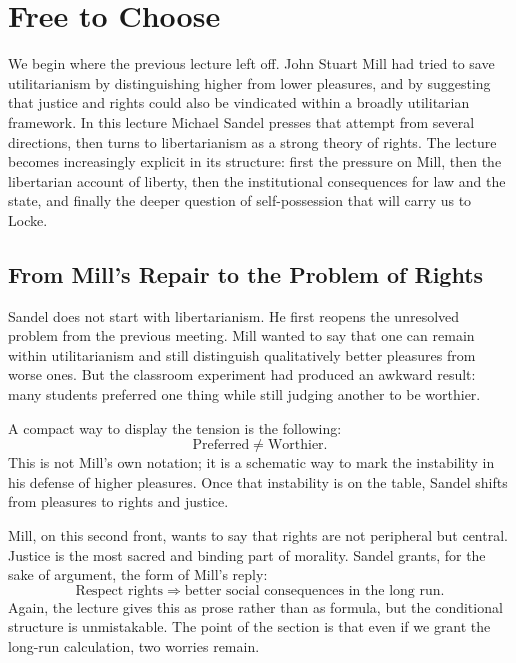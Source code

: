 \chapter{Free to Choose}

We begin where the previous lecture left off. John Stuart Mill had tried to save utilitarianism by distinguishing higher from lower pleasures, and by suggesting that justice and rights could also be vindicated within a broadly utilitarian framework. In this lecture Michael Sandel presses that attempt from several directions, then turns to libertarianism as a strong theory of rights. The lecture becomes increasingly explicit in its structure: first the pressure on Mill, then the libertarian account of liberty, then the institutional consequences for law and the state, and finally the deeper question of self-possession that will carry us to Locke.

\section{From Mill's Repair to the Problem of Rights}

Sandel does not start with libertarianism. He first reopens the unresolved problem from the previous meeting. Mill wanted to say that one can remain within utilitarianism and still distinguish qualitatively better pleasures from worse ones. But the classroom experiment had produced an awkward result: many students preferred one thing while still judging another to be worthier.

A compact way to display the tension is the following:
\begin{equation}
\text{Preferred} \neq \text{Worthier}.
\end{equation}
This is not Mill's own notation; it is a schematic way to mark the instability in his defense of higher pleasures. Once that instability is on the table, Sandel shifts from pleasures to rights and justice.

Mill, on this second front, wants to say that rights are not peripheral but central. Justice is the most sacred and binding part of morality. Sandel grants, for the sake of argument, the form of Mill's reply:
\begin{equation}
\text{Respect rights} \Longrightarrow \text{better social consequences in the long run}.
\end{equation}
Again, the lecture gives this as prose rather than as formula, but the conditional structure is unmistakable. The point of the section is that even if we grant the long-run calculation, two worries remain.

